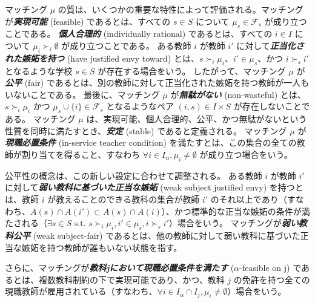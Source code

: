 \documentclass[12pt, a4paper]{article}
\theoremstyle{definition}
\theoremstyle{remark}
\theoremstyle{plain}
\begin{document}
マッチング $\mu$ の質は、いくつかの重要な特性によって評価される。マッチングが\textbf{\textit{実現可能}} (feasible) であるとは、すべての $s \in S$ について $\mu_s \in \mathcal{F}_s$ が成り立つことである。
\textbf{\textit{個人合理的}} (individually rational) であるとは、すべての $i \in I$ について $\mu_i \succ_i \emptyset$ が成り立つことである。
ある教師 $i$ が教師 $i'$ に対して\textbf{\textit{正当化された嫉妬を持つ}} (have justified envy toward) とは、$s \succ_i \mu_i$、$i' \in \mu_s$、かつ $i \succ_s i'$ となるような学校 $s \in S$ が存在する場合をいう。
したがって、マッチング $\mu$ が\textbf{\textit{公平}} (fair) であるとは、別の教師に対して正当化された嫉妬を持つ教師が一人もいないことである。
最後に、マッチング $\mu$ が\textbf{\textit{無駄がない}} (non-wasteful) とは、$s \succ_i \mu_i$ かつ $\mu_s \cup \{i\} \in \mathcal{F}_s$ となるようなペア $(i, s) \in I \times S$ が存在しないことである。
マッチング $\mu$ は、実現可能、個人合理的、公平、かつ無駄がないという性質を同時に満たすとき、\textbf{\textit{安定}} (stable) であると定義される。
マッチング $\mu$ が\textbf{\textit{現職必置条件}} (in-service teacher condition) を満たすとは、この集合の全ての教師が割り当てを得ること、すなわち $\forall i \in I_{\alpha}, \mu_i \neq \emptyset$ が成り立つ場合をいう。


公平性の概念は、この新しい設定に合わせて調整される。
ある教師 $i$ が教師 $i'$ に対して\textbf{\textit{弱い教科に基づいた正当な嫉妬}} (weak subject justified envy) を持つとは、教師 $i$ が教えることのできる教科の集合が教師 $i'$ のそれ以上であり（すなわち、$A(s) \cap A(i') \subset A(s) \cap A(i)$）、かつ標準的な正当な嫉妬の条件が満たされる（$\exists s \in S \text{ s.t. } s \succ_i \mu_i, i' \in \mu_s, i \succ_s i'$）場合をいう。
マッチングが\textbf{\textit{弱い教科公平}} (weak subject-fair) であるとは、他の教師に対して弱い教科に基づいた正当な嫉妬を持つ教師が誰もいない状態を指す。

さらに、マッチングが\textbf{\textit{教科jにおいて現職必置条件を満たす}} ($\alpha$-feasible on j) であるとは、複数教科制約の下で実現可能であり、かつ、教科 $j$ の免許を持つ全ての現職教師が雇用されている（すなわち、$\forall i \in I_\alpha \cap I_j, \mu_i \neq \emptyset$）場合をいう。

\end{document}
